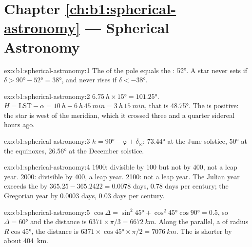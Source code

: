 \section*{Chapter \ref{ch:b1:spherical-astronomy} --- Spherical Astronomy}

\begin{solution}{exo:b1:spherical-astronomy:1}
The  of the pole equals the : \ang{52}. A star never sets if
$\delta > \ang{90} - \ang{52} = \ang{38}$, and never rises if
$\delta < \ang{-38}$.
\end{solution}

\begin{solution}{exo:b1:spherical-astronomy:2}
$\qty{6.75}{h}\times\ang{15} = \ang{101.25}$. $H = \mathrm{LST} - \alpha =
\qty{10}{h} - \qty{6}{h}\,\qty{45}{min} = \qty{3}{h}\,\qty{15}{min}$, that is
\ang{48.75}. The  is positive: the star is west of the meridian,
which it crossed three and a quarter sidereal hours ago.
\end{solution}

\begin{solution}{exo:b1:spherical-astronomy:3}
$h = \ang{90} - \varphi + \delta_\odot$: \ang{73.44} at the June solstice,
\ang{50} at the equinoxes, \ang{26.56} at the December solstice.
\end{solution}

\begin{solution}{exo:b1:spherical-astronomy:4}
1900: divisible by 100 but not by 400, not a leap year. 2000: divisible by
400, a leap year. 2100: not a leap year. The Julian year exceeds the  by $365.25 - 365.2422 = 0.0078$ days, \num{0.78} days per century; the
Gregorian year by $0.0003$ days, \num{0.03} days per century.
\end{solution}

\begin{solution}{exo:b1:spherical-astronomy:5}
$\cos\Delta = \sin^2\ang{45} + \cos^2\ang{45}\cos\ang{90} = 0.5$, so
$\Delta = \ang{60}$ and the distance is $6371\times\pi/3 = \qty{6672}{km}$.
Along the parallel, a  of radius $R\cos\ang{45}$, the distance is
$6371\times\cos\ang{45}\times\pi/2 = \qty{7076}{km}$. The  is
shorter by about \qty{404}{km}.
\end{solution}

